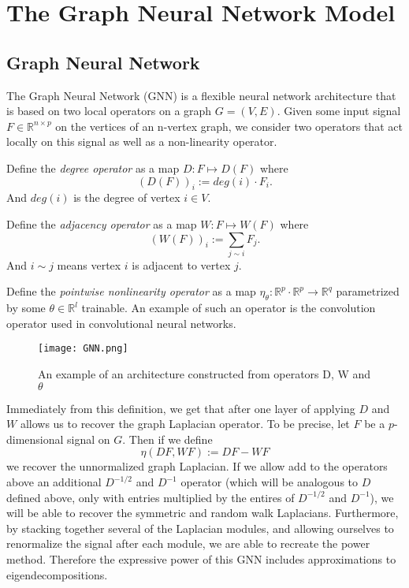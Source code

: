 \chapter{The Graph Neural Network Model}


\section{Graph Neural Network}

The Graph Neural Network (GNN) is a flexible neural network architecture that is based on two local operators on a graph $G = (V, E)$. Given some input signal $F \in \mathbb{R}^{n \times p}$ on the vertices of an n-vertex graph, we consider two operators that act locally on this signal as well as a non-linearity operator.\\

\begin{definition}Define the \textit{degree operator} as a map $D : F \mapsto D(F)$ where $$(D(F))_i := deg(i) \cdot F_i.$$  And $deg(i)$ is the degree of vertex $i \in V$.  
\end{definition}
\begin{definition}Define the \textit{adjacency operator} as a map $W: F \mapsto W(F)$ where $$(W(F))_i:= \sum_{j\sim i }F_j.$$ And $i \sim j$ means vertex $i$ is adjacent to vertex $j$. 
\end{definition}

\begin{definition}Define the \textit{pointwise nonlinearity operator} as a map $\eta_{\theta}: \mathbb{R}^p \cdot \mathbb{R}^p \rightarrow \mathbb{R}^q$ parametrized by some $\theta \in \mathbb{R}^l$ trainable. An example of such an operator is the convolution operator used in convolutional neural networks.\\
\end{definition}

\begin{figure}
\begin{center}
  \texttt{[image: GNN.png]}
  \caption{An example of an architecture constructed from operators D, W and $\theta$}
  \label{fig:GNN}
 \end{center}
\end{figure}

Immediately from this definition, we get that after one layer of applying $D$ and $W$ allows us to recover the graph Laplacian operator.  To be precise, let $F$ be a $p$-dimensional signal on $G$.  Then if we define $$ \eta(DF, WF) := DF - WF$$ we recover the unnormalized graph Laplacian.  If we allow add to the operators above an additional $D^{-1/2}$ and $D^{-1}$ operator (which will be analogous to $D$ defined above, only with entries multiplied by the entires of $D^{-1/2}$ and $D^{-1}$), we will be able to recover the symmetric and random walk Laplacians.  Furthermore, by stacking together several of the Laplacian modules, and allowing ourselves to renormalize the signal after each  module, we are able to recreate the power method.  Therefore the expressive power of this GNN includes approximations to eigendecompositions.\\

